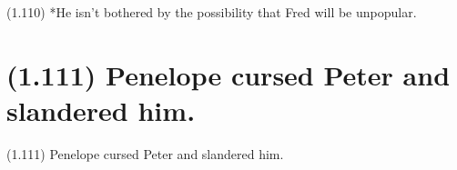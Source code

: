 \documentclass{article}
\begin{document}
\bigbreak
\begin{enumerate*}
\item[(1.110)] *He isn't bothered by the possibility that Fred will be unpopular.
\end{enumerate*}
\bigbreak

\bigbreak
\begin{minipage}{\textwidth}
\end{minipage}
\bigbreak

\clearpage

%
%

\section*{(1.111) Penelope cursed Peter and slandered him.}

\bigbreak
\begin{enumerate*}
\item[(1.111)] Penelope cursed Peter and slandered him.
\end{enumerate*}
\bigbreak

\bigbreak
\begin{minipage}{\textwidth}
\end{minipage}
\bigbreak

\clearpage

%
%
\end{document}
